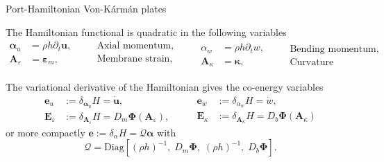 \documentclass[aspectratio=169]{beamer}
\begin{document}
\begin{frame}{Port-Hamiltonian Von-K\'arm\'an plates}
	
\begin{tcolorbox}[width=0.95\textwidth, nobeforeafter, colframe=theme,title=Energy variables]
The Hamiltonian functional is quadratic in the following variables
\begin{equation*}
	\begin{aligned}
		\bm{\alpha}_u &= \rho h \partial_t \bm{u},\\
		\bm{A}_\varepsilon &= \bm{\varepsilon}_m, \\
	\end{aligned} \quad
	\begin{aligned}
		&\text{Axial momentum},\\
		&\text{Membrane strain}, \\
	\end{aligned} \qquad
	\begin{aligned}
		\alpha_w &= \rho h \partial_t{w}, \\
		\bm{A}_\kappa &= \bm{\kappa},
	\end{aligned}\quad
	\begin{aligned}
		&\text{Bending momentum}, \\
		&\text{Curvature}
	\end{aligned}
\end{equation*}
\end{tcolorbox}
\vspace{.3cm}
\begin{tcolorbox}[width=0.95\textwidth, nobeforeafter, colframe=theme,title=Co-energy variables]
The variational derivative of the Hamiltonian gives the co-energy variables
\begin{equation*}
	\begin{aligned}
		\bm{e}_u &:= \delta_{\bm\alpha_u} H = \dot{\bm{u}},\\
		\bm{E}_\varepsilon &:= \delta_{\bm{A}_\varepsilon} H = D_m \bm{\Phi}(\bm{A}_\varepsilon),
	\end{aligned} \qquad
	\begin{aligned}
		\bm{e}_w &:= \delta_{\alpha_w} H = \dot{w}, \\
		\bm{E}_\kappa &:= \delta_{\bm{A}_\kappa} H = D_b\bm{\Phi}(\bm{A}_\kappa)
	\end{aligned}
\end{equation*}
or more compactly $\bm{e} := \delta_\alpha H = \mathcal{Q} \bm{\alpha}$ with
\begin{equation*}
	\mathcal{Q} = \mathrm{Diag}\left[(\rho h)^{-1}, \; D_m \bm{\Phi}, \; (\rho h)^{-1}, \; D_b \bm{\Phi}\right].
\end{equation*}
\end{tcolorbox}


\end{frame}
\end{document}
